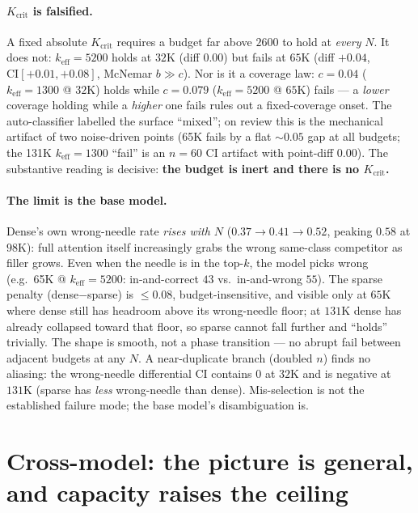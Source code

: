 \documentclass[11pt]{article}
\newcommand{\keff}{k_{\mathrm{eff}}}
\newcommand{\Kcrit}{K_{\mathrm{crit}}}
\begin{document}
\paragraph{$\Kcrit$ is falsified.}
A fixed absolute $\Kcrit$ requires a budget far above $2600$ to hold at \emph{every}
$N$. It does not: $\keff{=}5200$ holds at $32\mathrm{K}$ (diff $0.00$) but fails at
$65\mathrm{K}$ (diff $+0.04$, $\mathrm{CI}[+0.01,+0.08]$, McNemar $b\!\gg\!c$). Nor is
it a coverage law: $c{=}0.04$ ($\keff{=}1300$ @ $32\mathrm{K}$) holds while
$c{=}0.079$ ($\keff{=}5200$ @ $65\mathrm{K}$) fails --- a \emph{lower} coverage holding
while a \emph{higher} one fails rules out a fixed-coverage onset. The auto-classifier
labelled the surface ``mixed''; on review this is the mechanical artifact of two
noise-driven points (65K fails by a flat $\sim\!0.05$ gap at all budgets; the 131K
$\keff{=}1300$ ``fail'' is an $n{=}60$ CI artifact with point-diff $0.00$). The
substantive reading is decisive: \textbf{the budget is inert and there is no
$\Kcrit$.}

\paragraph{The limit is the base model.}
Dense's own wrong-needle rate \emph{rises with $N$}
($0.37\!\to\!0.41\!\to\!0.52$, peaking $0.58$ at $98\mathrm{K}$): full attention
itself increasingly grabs the wrong same-class competitor as filler grows. Even when
the needle is in the top-$k$, the model picks wrong (e.g.\ 65K @ $\keff{=}5200$:
in-and-correct $43$ vs.\ in-and-wrong $55$). The sparse penalty (dense$-$sparse) is
$\le 0.08$, budget-insensitive, and visible only at $65\mathrm{K}$ where dense still
has headroom above its wrong-needle floor; at $131\mathrm{K}$ dense has already
collapsed toward that floor, so sparse cannot fall further and ``holds'' trivially.
The shape is smooth, not a phase transition --- no abrupt fail between adjacent
budgets at any $N$. A near-duplicate branch (doubled $n$) finds no aliasing: the
wrong-needle differential CI contains $0$ at $32\mathrm{K}$ and is negative at
$131\mathrm{K}$ (sparse has \emph{less} wrong-needle than dense). Mis-selection is
not the established failure mode; the base model's disambiguation is.

\section{Cross-model: the picture is general, and capacity raises the ceiling}
\label{sec:cross}
\end{document}
